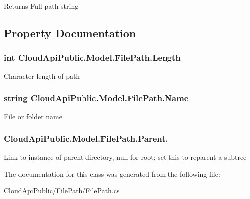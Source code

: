 \begin{DoxyReturn}{Returns}
Full path string
\end{DoxyReturn}


\subsection{Property Documentation}
\hypertarget{class_cloud_api_public_1_1_model_1_1_file_path_a6e415515bb70328b0ac881f9703be2c2}{
\subsubsection[{Length}]{\setlength{\rightskip}{0pt plus 5cm}int Cloud\-Api\-Public.\-Model.\-File\-Path.\-Length\hspace{0.3cm}{\ttfamily [get]}}}\label{class_cloud_api_public_1_1_model_1_1_file_path_a6e415515bb70328b0ac881f9703be2c2}


Character length of path 

\hypertarget{class_cloud_api_public_1_1_model_1_1_file_path_a02285f24ec2d49c85778d6b5a251aa7b}{
\subsubsection[{Name}]{\setlength{\rightskip}{0pt plus 5cm}string Cloud\-Api\-Public.\-Model.\-File\-Path.\-Name\hspace{0.3cm}{\ttfamily [get]}}}\label{class_cloud_api_public_1_1_model_1_1_file_path_a02285f24ec2d49c85778d6b5a251aa7b}


File or folder name 

\hypertarget{class_cloud_api_public_1_1_model_1_1_file_path_a4c3e4582847856e2a49370fb421d4c70}{
\subsubsection[{Parent}]{ Cloud\-Api\-Public.\-Model.\-File\-Path.\-Parent\hspace{0.3cm}{\ttfamily [get]}, {\ttfamily [set]}}}\label{class_cloud_api_public_1_1_model_1_1_file_path_a4c3e4582847856e2a49370fb421d4c70}


Link to instance of parent directory, null for root; set this to reparent a subtree 



The documentation for this class was generated from the following file\-:\begin{DoxyCompactItemize}
\item 
Cloud\-Api\-Public/\-File\-Path/File\-Path.\-cs\end{DoxyCompactItemize}

